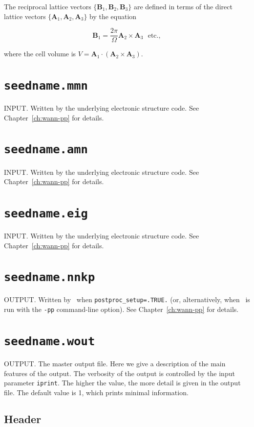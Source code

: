 The reciprocal lattice vectors
$\{\mathbf{B}_{1},\mathbf{B}_{2},\mathbf{B}_{3}\}$ are defined in
terms
of the direct lattice vectors
$\{\mathbf{A}_{1},\mathbf{A}_{2},\mathbf{A}_{3}\}$ by the equation

\begin{equation}
\mathbf{B}_{1} = \frac{2\pi}{\Omega}\mathbf{A}_{2}\times\mathbf{A}_{3}
\ \ \ \mathrm{etc.},
\end{equation}

where the cell volume is
$V=\mathbf{A}_{1}\cdot(\mathbf{A}_{2}\times\mathbf{A}_{3})$.

\section{{\tt seedname.mmn}}
INPUT. Written by the underlying electronic structure code. See
Chapter~\ref{ch:wann-pp} for details.

\section{{\tt seedname.amn}}
INPUT. Written by the underlying electronic structure code. See
Chapter~\ref{ch:wann-pp} for details. 

\section{{\tt seedname.eig}}
INPUT. Written by the underlying electronic structure code. See
Chapter~\ref{ch:wann-pp} for details.

\section{{\tt seedname.nnkp}} \label{sec:old-nnkp}
OUTPUT. Written by \wannier\ when {\tt postproc\_setup=.TRUE.} (or,
alternatively, when \wannier\ is run with the {\tt -pp} command-line
option). See Chapter~\ref{ch:wann-pp} for details.

\section{{\tt seedname.wout}}
OUTPUT. The master output file. Here we give a description of the main
features of the output. The verbosity of the output is controlled by
the input parameter {\tt iprint}. The higher the value, the more
detail is given in the output file. The default value is 1, which prints
minimal information.

\subsection{Header}

